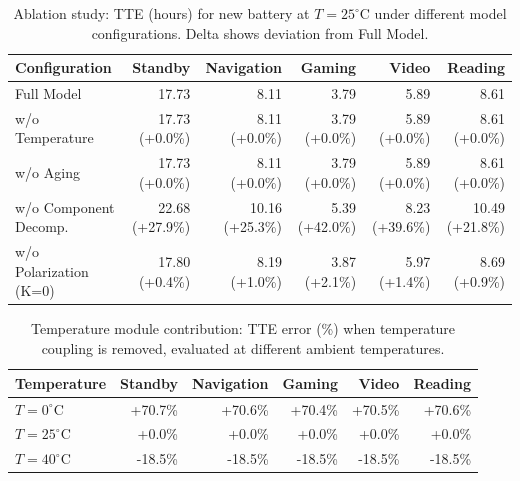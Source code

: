 \begin{table}[htbp]
\centering
\caption{Ablation study: TTE (hours) for new battery at $T=25^\circ$C under different model configurations. Delta shows deviation from Full Model.}
\label{tab:ablation_study}
\begin{tabular}{lrrrrr}
\hline
Configuration & Standby & Navigation & Gaming & Video & Reading \\
\hline
Full Model & 17.73 & 8.11 & 3.79 & 5.89 & 8.61 \\
w/o Temperature & 17.73 (+0.0\%) & 8.11 (+0.0\%) & 3.79 (+0.0\%) & 5.89 (+0.0\%) & 8.61 (+0.0\%) \\
w/o Aging & 17.73 (+0.0\%) & 8.11 (+0.0\%) & 3.79 (+0.0\%) & 5.89 (+0.0\%) & 8.61 (+0.0\%) \\
w/o Component Decomp. & 22.68 (+27.9\%) & 10.16 (+25.3\%) & 5.39 (+42.0\%) & 8.23 (+39.6\%) & 10.49 (+21.8\%) \\
w/o Polarization (K=0) & 17.80 (+0.4\%) & 8.19 (+1.0\%) & 3.87 (+2.1\%) & 5.97 (+1.4\%) & 8.69 (+0.9\%) \\
\hline
\end{tabular}
\end{table}

\begin{table}[htbp]
\centering
\caption{Temperature module contribution: TTE error (\%) when temperature coupling is removed, evaluated at different ambient temperatures.}
\label{tab:ablation_temperature}
\begin{tabular}{lrrrrr}
\hline
Temperature & Standby & Navigation & Gaming & Video & Reading \\
\hline
$T=0^\circ$C & +70.7\% & +70.6\% & +70.4\% & +70.5\% & +70.6\% \\
$T=25^\circ$C & +0.0\% & +0.0\% & +0.0\% & +0.0\% & +0.0\% \\
$T=40^\circ$C & -18.5\% & -18.5\% & -18.5\% & -18.5\% & -18.5\% \\
\hline
\end{tabular}
\end{table}
